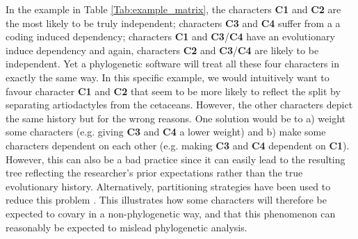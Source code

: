 \documentclass[12pt,letterpaper]{article}
\begin{document}
In the example in Table \ref{Tab:example_matrix}, the characters \textbf{C1} and \textbf{C2} are the most likely to be truly independent; characters \textbf{C3} and \textbf{C4} suffer from a a coding induced dependency; characters \textbf{C1} and \textbf{C3}/\textbf{C4} have an evolutionary induce dependency and again, characters \textbf{C2} and \textbf{C3}/\textbf{C4} are likely to be independent.
Yet a phylogenetic software will treat all these four characters in exactly the same way.
In this specific example, we would intuitively want to favour character \textbf{C1} and \textbf{C2} that seem to be more likely to reflect the split by separating artiodactyles from the cetaceans.
However, the other characters depict the same history %
 but for the wrong reasons. %
One solution would be to a) weight some characters (e.g. giving \textbf{C3} and \textbf{C4} a lower weight) and b) make some characters dependent on each other (e.g. making \textbf{C3} and \textbf{C4} dependent on \textbf{C1}).
However, this can also be a bad practice since it can easily lead to the resulting tree reflecting the researcher's prior expectations rather than the true evolutionary history.
Alternatively, partitioning strategies have been used to reduce this problem \citep[see][and references within]{Rosa2019}.
This illustrates how some characters will therefore be expected to covary in a non-phylogenetic way, and that this phenomenon can reasonably be expected to mislead phylogenetic analysis.
\end{document}
